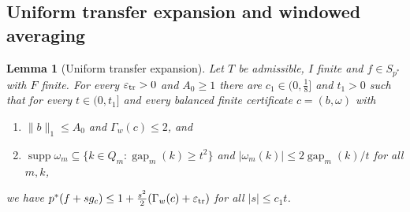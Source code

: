 \documentclass[10pt]{amsart}
\newtheorem{lemma}[theorem]{Lemma}
\theoremstyle{definition}
\theoremstyle{remark}
\newcommand{\supp}{\operatorname{supp}}
\newcommand{\gap}{\operatorname{gap}}
\begin{document}
\subsection{Uniform transfer expansion and windowed averaging}

\begin{lemma}[Uniform transfer expansion]\label{lem:uniformtransfer}
Let $T$ be admissible, $I$ finite and $f\in S_{p^*}$ with $F$ finite.  For
every $\varepsilon_{\rm tr}>0$ and $A_0\ge1$ there are $c_1\in(0,\frac18]$ and
$t_1>0$ such that for every $t\in(0,t_1]$ and every balanced finite
certificate $c=(b,\omega)$ with
\begin{enumerate}
\item[(C-a)] $\|b\|_1\le A_0$ and $\Gamma_w(c)\le2$, and
\item[(C-b)] $\supp\omega_m\subseteq\{k\in Q_m:\gap_m(k)\ge t^2\}$ and
$|\omega_m(k)|\le2\gap_m(k)/t$ for all $m,k$,
\end{enumerate}
we have $p^*(f+sg_c)\le1+\frac{s^2}2(\Gamma_w(c)+\varepsilon_{\rm tr})$ for
all $|s|\le c_1t$.
\end{lemma}
\end{document}
